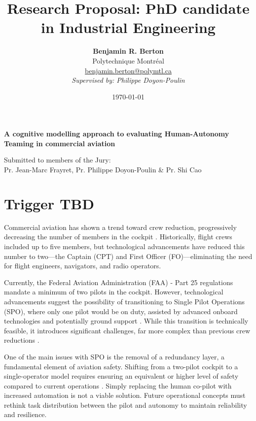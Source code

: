 \documentclass[12pt,a4paper]{article} %
\title{\textbf{Research Proposal: PhD candidate in Industrial Engineering}} %
\author{
	\textbf{Benjamin R. Berton}\\
	Polytechnique Montréal\\
	\href{mailto:benjamin.berton@polymtl.ca}{benjamin.berton@polymtl.ca}\\
	\textit{Supervised by: Philippe Doyon-Poulin}
} %
\begin{document}
	\maketitle %
	
	\begin{center}
		\textbf{A cognitive modelling approach to evaluating Human-Autonomy Teaming in commercial aviation}
	\end{center} %
	
	\begin{center}
		Submitted to members of the Jury:\\
		Pr. Jean-Marc Frayret, Pr. Philippe Doyon-Poulin \& Pr. Shi Cao\\
		\date{\today} %
	\end{center} %
	
	\newpage %
	
	\tableofcontents %
	\newpage %
	
	\section{Trigger \textbf{TBD}} %
	Commercial aviation has shown a trend toward crew reduction, progressively decreasing the number of members in the cockpit \parencite{harris_human-centred_2007}. Historically, flight crews included up to five members, but technological advancements have reduced this number to two—the Captain (CPT) and First Officer (FO)—eliminating the need for flight engineers, navigators, and radio operators.
	
	Currently, the Federal Aviation Administration (FAA) - Part 25 regulations mandate a minimum of two pilots in the cockpit. However, technological advancements suggest the possibility of transitioning to Single Pilot Operations (SPO), where only one pilot would be on duty, assisted by advanced onboard technologies and potentially ground support \parencite{bilimoria_conceptual_2014}. While this transition is technically feasible, it introduces significant challenges, far more complex than previous crew reductions \parencite{matessa_using_2017}.
	
	One of the main issues with SPO is the removal of a redundancy layer, a fundamental element of aviation safety. Shifting from a two-pilot cockpit to a single-operator model requires ensuring an equivalent or higher level of safety compared to current operations \parencite{boy_requirements_2014}. Simply replacing the human co-pilot with increased automation is not a viable solution. Future operational concepts must rethink task distribution between the pilot and autonomy to maintain reliability and resilience.
	
\end{document}
